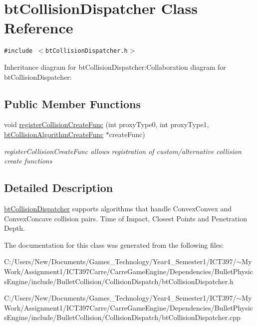 \hypertarget{classbt_collision_dispatcher}{
\section{btCollisionDispatcher Class Reference}
\label{classbt_collision_dispatcher}
}
{\tt \#include $<$btCollisionDispatcher.h$>$}

Inheritance diagram for btCollisionDispatcher:Collaboration diagram for btCollisionDispatcher:\subsection*{Public Member Functions}
\begin{CompactItemize}
\item 
\hypertarget{classbt_collision_dispatcher_c754ecadc2116cdf75d63c207937aeac}{
void \hyperlink{classbt_collision_dispatcher_c754ecadc2116cdf75d63c207937aeac}{registerCollisionCreateFunc} (int proxyType0, int proxyType1, \hyperlink{structbt_collision_algorithm_create_func}{btCollisionAlgorithmCreateFunc} $\ast$createFunc)}
\label{classbt_collision_dispatcher_c754ecadc2116cdf75d63c207937aeac}

\begin{CompactList}\small\item\em registerCollisionCreateFunc allows registration of custom/alternative collision create functions \item\end{CompactList}\end{CompactItemize}


\subsection{Detailed Description}
\hyperlink{classbt_collision_dispatcher}{btCollisionDispatcher} supports algorithms that handle ConvexConvex and ConvexConcave collision pairs. Time of Impact, Closest Points and Penetration Depth. 

The documentation for this class was generated from the following files:\begin{CompactItemize}
\item 
C:/Users/New/Documents/Games\_\-Technology/Year4\_\-Semester1/ICT397/$\sim$My Work/Assignment1/ICT397Carre/CarreGameEngine/Dependencies/BulletPhysicsEngine/include/BulletCollision/CollisionDispatch/btCollisionDispatcher.h\item 
C:/Users/New/Documents/Games\_\-Technology/Year4\_\-Semester1/ICT397/$\sim$My Work/Assignment1/ICT397Carre/CarreGameEngine/Dependencies/BulletPhysicsEngine/include/BulletCollision/CollisionDispatch/btCollisionDispatcher.cpp\end{CompactItemize}
